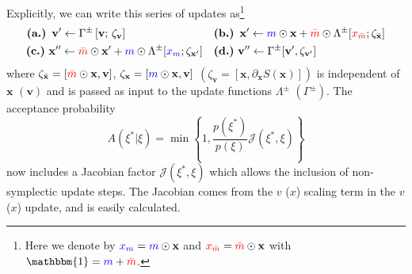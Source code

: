 \documentclass[a4paper,11pt]{article}
\newcommand{\x}{\mathbf{x}}
\newcommand{\p}{\mathbf{v}}
\newcommand{\mask}{\textcolor{blue}{{m}}}
\newcommand{\maskbar}{\textcolor{red}{\bar{m}}}
\newcommand{\xmask}{\textcolor{blue}{{x}_{m}}}
\newcommand{\xmaskbar}{\textcolor{red}{x_{\bar{m}}}}
\begin{document}
Explicitly, we can write this series of updates as\footnote{%
  Here we denote by \(\xmask = \mask \odot \x\) and 
  \(\xmaskbar = \maskbar \odot \x\) with \(\mathbbm{1} = \mask + \maskbar\).
}
%
\begin{align}
    \nonumber
    \textbf{(a.)}\,\,\, \p'
        \gets \Gamma^{\pm}\left[\p;\, \zeta_{\p} \right]\hspace{80pt}
    &\textbf{(b.)}\,\,\, \x'
        \gets \mask \odot \x + \maskbar \odot \Lambda^{\pm} [\xmaskbar; \zeta_{\bar{\x}}] \\
    \nonumber
    \textbf{(c.)}\,\, \x''
        \gets \maskbar \odot \x' + \mask \odot \Lambda^{\pm} [\xmask; \zeta_{\x'}] \quad
    &\textbf{(d.)}\,\, \p''
        \gets \Gamma^{\pm} [\p', \zeta_{\p'}]
\end{align}
%
where \(\zeta_{\bar{\x}} = [\maskbar\odot \x, \p]\), \(\zeta_{\x} = [\mask \odot \x,
\p]\) \((\zeta_{\p} = [\x, \partial_{\x} S(\x)])\) is independent of \(\x\) \((\p)\)
and is passed as input to the update functions \(\Lambda^{\pm}\)
\((\Gamma^{\pm})\).
%
The acceptance probability
%
\begin{equation}
A(\xi^{\ast} | \xi) =
\min\left\{1, \frac{p(\xi^{\ast})}{p(\xi)} \mathcal{J}(\xi^{\ast},\xi) \right\}
\end{equation}
%
now includes a Jacobian factor $\mathcal{J}(\xi^{\ast},\xi)$
which allows the inclusion of non-symplectic update steps.
The Jacobian comes from the $v$ ($x$) scaling term in the $v$ ($x$) update, and
is easily calculated.
%
\end{document}
